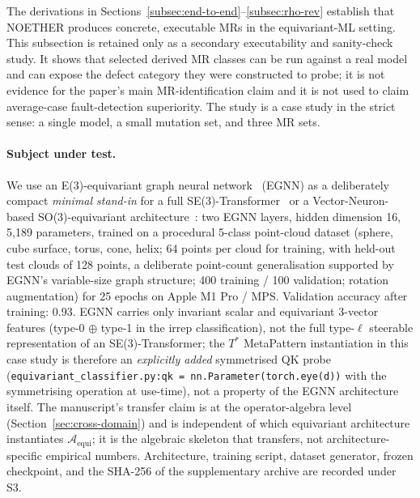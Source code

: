 \documentclass[acmsmall,screen,review]{acmart}
\begin{document}
The derivations in Sections~\ref{subsec:end-to-end}--\ref{subsec:rho-rev}
establish that NOETHER produces concrete, executable MRs in the equivariant-ML
setting. This subsection is retained only as a secondary executability and
sanity-check study. It shows that selected derived MR classes can be run against
a real model and can expose the defect category they were constructed to probe;
it is not evidence for the paper's main MR-identification claim and it is not
used to claim average-case fault-detection superiority. The study is a case
study in the strict sense: a single model, a small mutation set, and three MR
sets.

\paragraph{Subject under test.}
We use an E(3)-equivariant graph neural network~\cite{Satorras2021EGNN} (EGNN) as a deliberately compact \emph{minimal stand-in} for a full SE(3)-Transformer~\cite{FuchsTransformer2020} or a Vector-Neuron-based SO(3)-equivariant architecture~\cite{Deng2021VectorNeurons}: two EGNN layers, hidden dimension 16, 5{,}189 parameters, trained on a procedural 5-class point-cloud dataset (sphere, cube surface, torus, cone, helix; 64 points per cloud for training, with held-out test clouds of 128 points, a deliberate point-count generalisation supported by EGNN's variable-size graph structure; 400 training / 100 validation; rotation augmentation) for 25 epochs on Apple M1 Pro / MPS. Validation accuracy after training: 0.93. EGNN carries only invariant scalar and equivariant 3-vector features (type-0 $\oplus$ type-1 in the irrep classification), not the full type-$\ell$ steerable representation of an SE(3)-Transformer; the $T^*$ MetaPattern instantiation in this case study is therefore an \emph{explicitly added} symmetrised QK probe (\texttt{equivariant\_classifier.py:qk = nn.Parameter(torch.eye(d))} with the symmetrising operation at use-time), not a property of the EGNN architecture itself. The manuscript's transfer claim is at the operator-algebra level (Section~\ref{sec:cross-domain}) and is independent of which equivariant architecture instantiates $\mathcal{A}_{\mathrm{equi}}$; it is the algebraic skeleton that transfers, not architecture-specific empirical numbers. Architecture, training script, dataset generator, frozen checkpoint, and the SHA-256 of the supplementary archive are recorded under S3.
\end{document}
